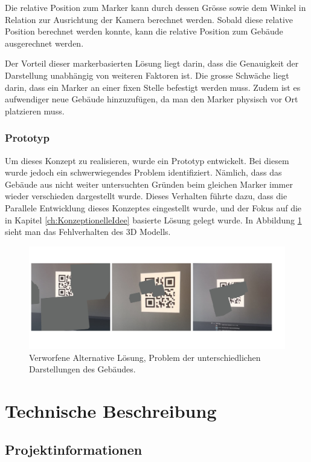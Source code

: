 \documentclass[a4paper]{scrreprt}
\begin{document}
Die relative Position zum Marker kann durch dessen Grösse sowie dem Winkel in Relation zur Ausrichtung der Kamera berechnet werden. Sobald diese relative Position berechnet werden konnte, kann die relative Position zum Gebäude ausgerechnet werden.

Der Vorteil dieser markerbasierten Lösung liegt darin, dass die Genauigkeit der Darstellung unabhängig von weiteren Faktoren ist. Die grosse Schwäche liegt darin, dass ein Marker an einer fixen Stelle befestigt werden muss. Zudem ist es aufwendiger neue Gebäude hinzuzufügen, da man den Marker physisch vor Ort platzieren muss.

\subsection{Prototyp}
Um dieses Konzept zu realisieren, wurde ein Prototyp entwickelt. Bei diesem wurde jedoch ein schwerwiegendes Problem identifiziert. Nämlich, dass das Gebäude aus nicht weiter untersuchten Gründen beim gleichen Marker immer wieder verschieden dargestellt wurde. Dieses Verhalten führte dazu, dass die Parallele Entwicklung dieses Konzeptes eingestellt wurde, und der Fokus auf die in Kapitel 
\ref{ch:KonzeptionelleIdee} basierte Lösung gelegt wurde. In Abbildung \ref{fig:alternativeSolution} sieht man das Fehlverhalten des 3D Modells.

\begin{figure}[h!]
	\includegraphics[keepaspectratio, width=\textwidth]{alternativeLoesung.png}
	\caption{Verworfene Alternative Lösung, Problem der unterschiedlichen Darstellungen des Gebäudes.}
    \label{fig:alternativeSolution}
\end{figure}

\chapter{Technische Beschreibung}

\section{Projektinformationen}
\end{document}

